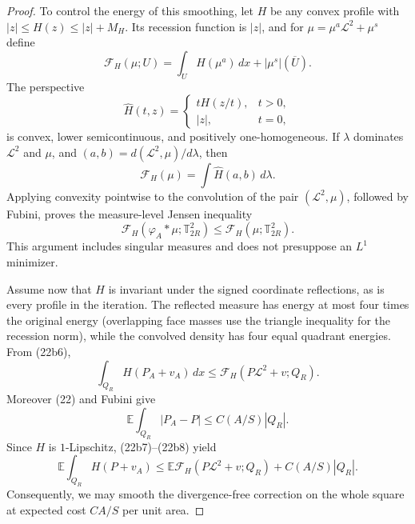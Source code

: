 \documentclass{smfart}
\theoremstyle{definition}
\newcommand{\1}{\mathbf 1}
\begin{document}
\begin{proof}
To control the energy of this smoothing, let $H$ be any convex profile with
$|z|\leq H(z)\leq|z|+M_ H$.  Its recession function is $|z|$, and
for $\mu=\mu^a\mathcal L^2+\mu^s$ define
\begin{equation*}
\mathcal F_ H(\mu;U)=\int_ UH(\mu^a)\,dx+|\mu^s|(\overline U).
\end{equation*}
The perspective
\begin{equation*}
\widehat H(t,z)=
\begin{cases}tH(z/t),&t>0,\\ |z|,&t=0,
\end{cases}
\end{equation*}
is convex, lower semicontinuous, and positively one-homogeneous.  If
$\lambda$ dominates $\mathcal L^2$ and $\mu$, and
$(a,b)=d(\mathcal L^2,\mu)/d\lambda$, then
\begin{equation}
\mathcal F_ H(\mu)=\int\widehat H(a,b)\,d\lambda.
\tag{22b5}
\end{equation}
Applying convexity pointwise to the convolution of the pair
$(\mathcal L^2,\mu)$, followed by Fubini, proves the measure-level
Jensen inequality
\begin{equation}
\mathcal F_ H(\varphi_ A*\mu;\mathbb T_ {2R}^2)
\leq\mathcal F_ H(\mu;\mathbb T_ {2R}^2).
\tag{22b6}
\end{equation}
This argument includes singular measures and does not presuppose an
$L^1$ minimizer.

Assume now that $H$ is invariant under the signed coordinate
reflections, as is every profile in the iteration.  The reflected
measure has energy at most four times the original energy (overlapping
face masses use the triangle inequality for the recession norm), while
the convolved density has four equal quadrant energies.  From (22b6),
\begin{equation}
\int_ {Q_ R}H(P_ A+v_ A)\,dx
\leq\mathcal F_ H(P\mathcal L^2+v;Q_ R).
\tag{22b7}
\end{equation}
Moreover (22) and Fubini give
\begin{equation}
\mathbb E\int_ {Q_ R}|P_ A-P|\leq C(A/S)|Q_ R|.
\tag{22b8}
\end{equation}
Since $H$ is $1$-Lipschitz, (22b7)--(22b8) yield
\begin{equation}
\mathbb E\int_ {Q_ R}H(P+v_ A)
\leq\mathbb E\mathcal F_ H(P\mathcal L^2+v;Q_ R)
+C(A/S)|Q_ R|.
\tag{22b9}
\end{equation}
Consequently, we may smooth the divergence-free correction on the
whole square at expected cost $CA/S$ per unit area.


\end{proof}
\end{document}
